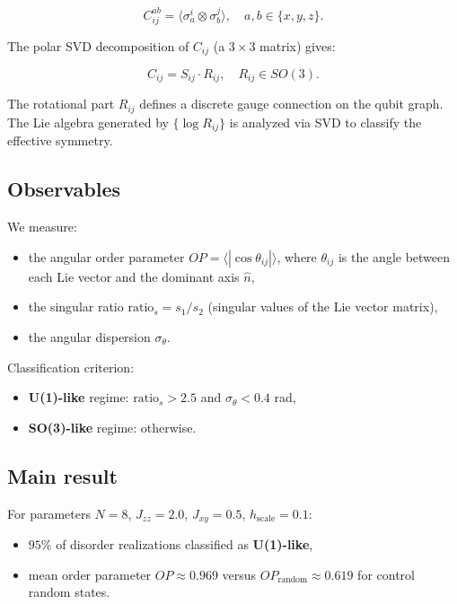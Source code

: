 \documentclass[11pt]{article}
\begin{document}
\[
C_{ij}^{ab} = \langle \sigma_a^i \otimes \sigma_b^j \rangle, \quad a,b \in \{x,y,z\}.
\]

The polar SVD decomposition of $C_{ij}$ (a $3\times3$ matrix) gives:

\[
C_{ij} = S_{ij} \cdot R_{ij}, \quad R_{ij} \in SO(3).
\]

The rotational part $R_{ij}$ defines a discrete gauge connection
on the qubit graph. The Lie algebra generated by $\{\log R_{ij}\}$
is analyzed via SVD to classify the effective symmetry.

\subsection{Observables}

We measure:

\begin{itemize}
\item the angular order parameter $OP = \langle |\cos\theta_{ij}| \rangle$,
      where $\theta_{ij}$ is the angle between each Lie vector and
      the dominant axis $\hat{n}$,
\item the singular ratio $\mathrm{ratio}_s = s_1 / s_2$
      (singular values of the Lie vector matrix),
\item the angular dispersion $\sigma_\theta$.
\end{itemize}

Classification criterion:
\begin{itemize}
\item \textbf{U(1)-like} regime: $\mathrm{ratio}_s > 2.5$ and
      $\sigma_\theta < 0.4$ rad,
\item \textbf{SO(3)-like} regime: otherwise.
\end{itemize}

\subsection{Main result}

For parameters $N=8$, $J_{zz}=2.0$, $J_{xy}=0.5$, $h_{\mathrm{scale}}=0.1$:

\begin{itemize}
\item $95\%$ of disorder realizations classified as \textbf{U(1)-like},
\item mean order parameter $OP \approx 0.969$ versus
      $OP_{\mathrm{random}} \approx 0.619$ for control random states.
\end{itemize}
\end{document}

